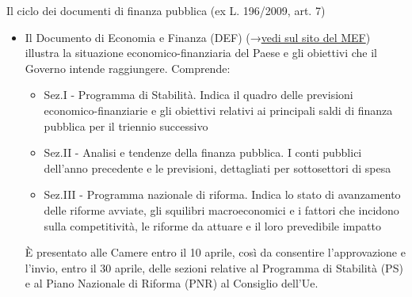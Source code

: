 \documentclass[aspectratio=64,11pt]{beamer}
\begin{document}
\begin{frame}{Il ciclo dei documenti di finanza pubblica (ex L. 196/2009, art. 7)}

  \begin{itemize}
  \item Il \alert{Documento di Economia e Finanza (DEF)}
    (→\href{http://www.mef.gov.it/documenti-pubblicazioni/doc-finanza-pubblica/index.html}{vedi sul sito del MEF})
    illustra la situazione economico-finanziaria del Paese e gli obiettivi che
    il Governo intende raggiungere. Comprende:
    \begin{itemize}
    \item \alert{Sez.I - Programma di Stabilità}. Indica il quadro delle
      previsioni economico-finanziarie e gli obiettivi relativi ai principali
      saldi di finanza pubblica per il triennio successivo
    \item \alert{Sez.II - Analisi e tendenze della finanza pubblica.} I conti
      pubblici dell'anno precedente e le previsioni, dettagliati per
      sottosettori di spesa
    \item \alert{Sez.III - Programma nazionale di riforma.} Indica lo stato di
      avanzamento delle riforme avviate, gli squilibri macroeconomici e i
      fattori che incidono sulla competitività, le riforme da attuare e il
      loro prevedibile impatto
    \end{itemize}
    È presentato alle Camere entro il 10 aprile, così da consentire l’approvazione
    e l’invio, entro il 30 aprile, delle sezioni relative al Programma di
    Stabilità (PS) e al Piano Nazionale di Riforma (PNR) al Consiglio dell’Ue.
  \end{itemize}
\end{frame}
\end{document}
